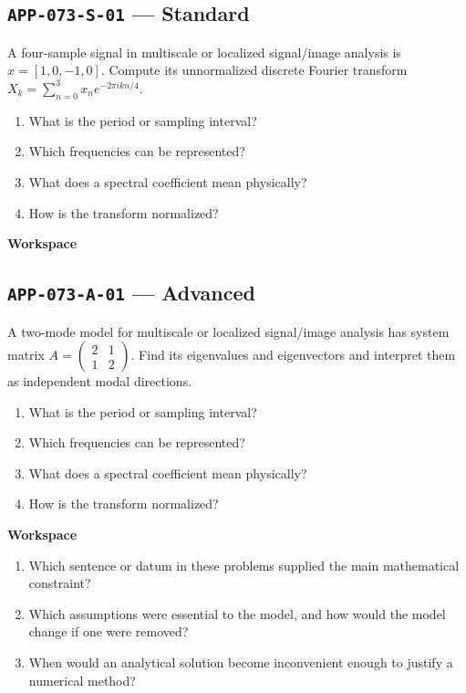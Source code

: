 \documentclass[11pt]{book}
\newcommand{\pid}[1]{\texttt{#1}}
\newcommand{\workspace}{\par\vspace{0.7in}\hrulefill\par\vspace{0.55in}\hrulefill\par}
\begin{document}
\subsection*{\pid{APP-073-S-01} — Standard}
\begin{problembox}
A four-sample signal in multiscale or localized signal/image analysis is $x=[1,0,-1,0]$. Compute its unnormalized discrete Fourier transform $X_k=\sum_{n=0}^3 x_ne^{-2\pi i kn/4}$.
\end{problembox}
\begin{promptbox}\begin{enumerate}
\item What is the period or sampling interval?
\item Which frequencies can be represented?
\item What does a spectral coefficient mean physically?
\item How is the transform normalized?
\end{enumerate}\end{promptbox}
\textbf{Workspace}\workspace
{}
\subsection*{\pid{APP-073-A-01} — Advanced}
\begin{problembox}
A two-mode model for multiscale or localized signal/image analysis has system matrix $A=\begin{pmatrix}2&1\\1&2\end{pmatrix}$. Find its eigenvalues and eigenvectors and interpret them as independent modal directions.
\end{problembox}
\begin{promptbox}\begin{enumerate}
\item What is the period or sampling interval?
\item Which frequencies can be represented?
\item What does a spectral coefficient mean physically?
\item How is the transform normalized?
\end{enumerate}\end{promptbox}
\textbf{Workspace}\workspace
\begin{reflectionbox}\begin{enumerate}
\item Which sentence or datum in these problems supplied the main mathematical constraint?
\item Which assumptions were essential to the model, and how would the model change if one were removed?
\item When would an analytical solution become inconvenient enough to justify a numerical method?
\end{enumerate}\end{reflectionbox}
\end{document}
